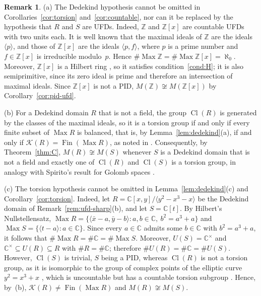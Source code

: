 \documentclass[12pt,reqno,a4paper]{amsart}
\newcommand{\Z}{\mathbb{Z}}
\newcommand{\C}{\mathbb{C}}
\newcommand{\K}{\mathcal{K}}
\DeclareMathOperator{\Max}{Max}
\DeclareMathOperator{\Fin}{Fin}
\DeclareMathOperator{\Cl}{Cl}
\theoremstyle{plain}
\theoremstyle{definition}
\newtheorem{remark}[theorem]{Remark}
\begin{document}
\begin{remark}\label{rem:dedekind-sharp}
(a) The Dedekind hypothesis cannot be omitted in Corollaries~\ref{cor:torsion} and~\ref{cor:countable}, nor can it be replaced by the hypothesis that $R$ and $S$ are UFDs. Indeed, $\Z$ and $\Z[x]$ are countable UFDs with two units each. It is well known that the maximal ideals of $\Z$ are the ideals $\langle p\rangle$, and those of $\Z[x]$ are the ideals $\langle p,f\rangle$, where $p$ is a prime number and $f\in\Z[x]$ is irreducible modulo~$p$. Hence $\#{\Max\Z}=\#{\Max\Z[x]}=\aleph_0$. Moreover, $\Z[x]$ is a Hilbert ring \cite[Theorem~4.19]{Eisenbud}, so it satisfies condition~\ref{cond:H}; it is also semiprimitive, since its zero ideal is prime and therefore an intersection of maximal ideals. Since $\Z[x]$ is not a PID, $M(\Z)\not\cong M(\Z[x])$ by Corollary~\ref{cor:pid-ufd}.

(b) For a Dedekind domain $R$ that is not a field, the group $\Cl(R)$ is generated by the classes of the maximal ideals, so it is a torsion group if and only if every finite subset of $\Max R$ is balanced, that is, by Lemma~\ref{lem:dedekind}(a), if and only if $\K(R)=\Fin(\Max R)$, as noted in \cite[Section~3]{Spirito}. Consequently, by Theorem~\ref{thm:C}, $M(R)\not\cong M(S)$ whenever $S$ is a Dedekind domain that is not a field and exactly one of $\Cl(R)$ and $\Cl(S)$ is a torsion group, in analogy with Spirito's result for Golomb spaces \cite[Theorem~3.4]{Spirito}.

(c) The torsion hypothesis cannot be omitted in Lemma~\ref{lem:dedekind}(c) and Corollary~\ref{cor:torsion}. Indeed, let $R=\C[x,y]/\langle y^2-x^3-x\rangle$ be the Dedekind domain of Remark~\ref{rem:ufd-sharp}(b), and let $S=\C[t]$. By Hilbert's Nullstellensatz, $\Max R=\{\langle\bar x-a,\bar y-b\rangle:a,b\in\C,\ b^2=a^3+a\}$ and $\Max S=\{\langle t-a\rangle:a\in\C\}$. Since every $a\in\C$ admits some $b\in\C$ with $b^2=a^3+a$, it follows that $\#{\Max R}=\#\C=\#{\Max S}$. Moreover, $U(S)=\C^\times$ and $\C^\times\subseteq U(R)\subseteq R$ with $\#R=\#\C$; therefore $\#U(R)=\#\C=\#U(S)$. However, $\Cl(S)$ is trivial, $S$ being a PID, whereas $\Cl(R)$ is not a torsion group, as it is isomorphic to the group of complex points of the elliptic curve $y^2=x^3+x$ \cite[Section~2.4]{ClarkElliptic}, which is uncountable but has a countable torsion subgroup \cite[Corollary~III.6.4(b)]{Silverman}. Hence, by~(b), $\K(R)\neq\Fin(\Max R)$ and $M(R)\not\cong M(S)$.
\end{remark}
\end{document}

